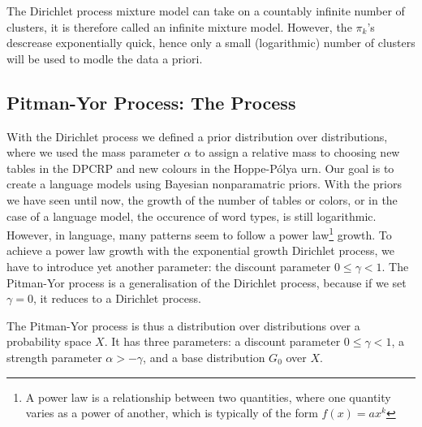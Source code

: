 The Dirichlet process mixture model can take on a countably infinite number of clusters, it is therefore called an infinite mixture model. However, the $\pi_k$'s descrease exponentially quick, hence only a small (logarithmic) number of clusters will be used to modle the data a priori.



\subsection{Pitman-Yor Process: The Process}
With the Dirichlet process we defined a prior distribution over distributions, where we used the mass parameter $\alpha$ to assign a relative mass to choosing new tables in the DPCRP and new colours in the Hoppe-P\'olya urn. Our goal is to create a language models using Bayesian nonparamatric priors. With the priors we have seen until now, the growth of the number of tables or colors, or in the case of a language model, the occurence of word types, is still logarithmic. However, in language, many patterns seem to follow a power law\footnote{A power law is a relationship between two quantities, where one quantity varies as a power of another, which is typically of the form $f(x)=ax^k$} growth.\cite{Goldwater2006Interpolating} 
To achieve a power law growth with the exponential growth Dirichlet process, we have to introduce yet another parameter: the discount parameter $0 \leq \gamma < 1$. The Pitman-Yor process is a generalisation of the Dirichlet process, because if we set $\gamma = 0$, it reduces to a Dirichlet process.

The Pitman-Yor process is thus a distribution over distributions over a probability space $X$. It has three parameters: a discount parameter $0\leq\gamma<1$, a strength parameter $\alpha > -\gamma$, and a base distribution $G_0$ over $X$. 

